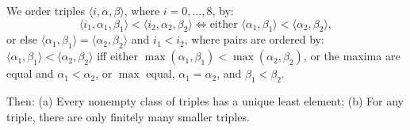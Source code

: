 We order triples $\langle i, \alpha, \beta \rangle$, where $i = 0, \ldots, 8$, by:
$$\langle i_1, \alpha_1, \beta_1 \rangle < \langle i_2, \alpha_2, \beta_2 \rangle \Leftrightarrow \text{either } \langle \alpha_1, \beta_1 \rangle < \langle \alpha_2, \beta_2 \rangle,$$
or else $\langle \alpha_1, \beta_1 \rangle = \langle \alpha_2, \beta_2 \rangle$ and $i_1 < i_2$,
where pairs are ordered by: $\langle \alpha_1, \beta_1 \rangle < \langle \alpha_2, \beta_2 \rangle$ iff either $\max(\alpha_1, \beta_1) < \max(\alpha_2, \beta_2)$, or the maxima are equal and $\alpha_1 < \alpha_2$, or $\max$ equal, $\alpha_1 = \alpha_2$, and $\beta_1 < \beta_2$.

Then: (a) Every nonempty class of triples has a unique least element; (b) For any triple, there are only finitely many smaller triples.